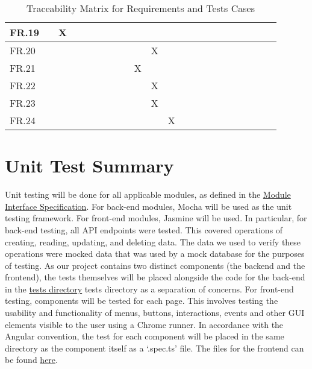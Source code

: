 \documentclass[12pt, titlepage]{article}
\begin{document}
\begin{landscape}
\begin{table}
\begin{tabularx}{1.692\textwidth}{|p{1cm}|p{0.6cm}|p{0.6cm}|p{0.6cm}|p{0.6cm}|p{0.6cm}|p{0.6cm}|p{0.6cm}|p{0.6cm}|p{0.6cm}|p{0.6cm}|p{0.6cm}|p{0.6cm}|p{0.6cm}|p{0.6cm}|p{0.6cm}|p{0.6cm}|p{0.6cm}|p{0.6cm}|p{0.6cm}|p{0.6cm}|p{0.6cm}|}
  FR.19 &  & X &  & & & &  &  &  & &  & & & & & & & & & &\\\hline
  FR.20 &  & &  & & & & & & &X &  & & & & & & & & & &\\\hline
  FR.21 &  &  &  & & & & & &X & & & &  & & & & & & & &\\\hline
  FR.22 &  &  &  & & & & & & &X & & &  & & & & & & & & \\\hline
  FR.23 &  &  &  & & & & & & &X & & &  & & & & & & & &\\\hline
  FR.24 &  &  &  & & & & & & & &X & &  & & & & & & & &\\\hline
  \end{tabularx}
    \caption{Traceability Matrix for Requirements and Tests Cases}
    \label{tab:trace2}
\end{table}
\end{landscape} 



 \section{Unit Test Summary}
    
Unit testing will be done for all applicable modules, as defined in the \href{https://github.com/Tamas-Leung/CodeChamp/blob/main/docs/Design/MIS/MIS.pdf}{Module Interface Specification}. For back-end modules, Mocha will be used as the unit testing framework. For front-end modules, Jasmine will be used. In particular, for back-end testing, all API endpoints were tested. This covered operations of creating, reading, updating, and deleting data. The data we used to verify these operations were mocked data that was used by a mock database for the purposes of testing. As our project contains two distinct components (the backend and the frontend), the tests themselves will be placed alongside the code for the back-end in the \href{https://github.com/Tamas-Leung/CodeChamp/tree/main/src/backend}{tests directory} tests directory as a separation of concerns. For front-end testing, components will be tested for each page. This involves testing the usability and functionality of menus, buttons, interactions, events and other GUI elements visible to the user using a Chrome runner. In accordance with the Angular convention, the test for each component will be placed in the same directory as the component itself as a `.spec.ts' file. The files for the frontend can be found \href{https://github.com/Tamas-Leung/CodeChamp/tree/main/src/frontend}{here}.
\end{document}
